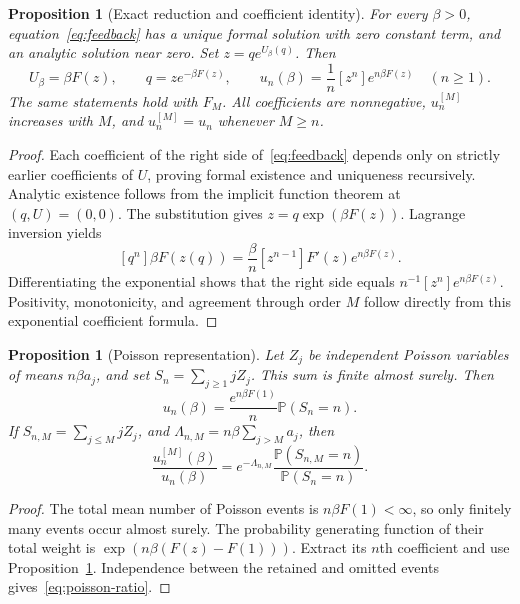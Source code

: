 \documentclass[11pt,a4paper]{article}
\numberwithin{equation}{section}
\newtheorem{proposition}[theorem]{Proposition}
\theoremstyle{definition}
\theoremstyle{remark}
\newcommand{\Prob}{\mathbb P}
\begin{document}
\begin{proposition}[Exact reduction and coefficient identity]
\label{prop:lagrange}
For every \(\beta>0\), equation~\eqref{eq:feedback} has a unique formal solution
with zero constant term, and an analytic solution near zero. Set
\(z=q e^{U_\beta(q)}\). Then
\begin{equation}
 U_\beta=\beta F(z),\qquad q=z e^{-\beta F(z)},\qquad
 u_n(\beta)=\frac1n[z^n]e^{n\beta F(z)}\quad(n\ge1).
 \label{eq:lagrange}
\end{equation}
The same statements hold with \(F_M\). All coefficients are nonnegative,
\(u_n^{[M]}\) increases with \(M\), and
\(u_n^{[M]}=u_n\) whenever \(M\ge n\).
\end{proposition}
\begin{proof}
Each coefficient of the right side of~\eqref{eq:feedback} depends only on
strictly earlier coefficients of \(U\), proving formal existence and
uniqueness recursively. Analytic existence follows from the implicit function
theorem at \((q,U)=(0,0)\). The substitution gives
\(z=q\exp(\beta F(z))\). Lagrange inversion yields
\[
 [q^n]\beta F(z(q))=\frac\beta n[z^{n-1}]F'(z)e^{n\beta F(z)}.
\]
Differentiating the exponential shows that the right side equals
\(n^{-1}[z^n]e^{n\beta F(z)}\). Positivity, monotonicity, and agreement through
order \(M\) follow directly from this exponential coefficient formula.
\end{proof}

\begin{proposition}[Poisson representation]
\label{prop:poisson}
Let \(Z_j\) be independent Poisson variables of means \(n\beta a_j\), and set
\(S_n=\sum_{j\ge1}jZ_j\). This sum is finite almost surely. Then
\begin{equation}
 u_n(\beta)=\frac{e^{n\beta F(1)}}n\Prob(S_n=n).
 \label{eq:poisson}
\end{equation}
If \(S_{n,M}=\sum_{j\le M}jZ_j\), and
\(\Lambda_{n,M}=n\beta\sum_{j>M}a_j\), then
\begin{equation}
 \frac{u_n^{[M]}(\beta)}{u_n(\beta)}
 =e^{-\Lambda_{n,M}}\frac{\Prob(S_{n,M}=n)}{\Prob(S_n=n)}.
 \label{eq:poisson-ratio}
\end{equation}
\end{proposition}
\begin{proof}
The total mean number of Poisson events is \(n\beta F(1)<\infty\), so only
finitely many events occur almost surely. The probability generating function
of their total weight is \(\exp(n\beta(F(z)-F(1)))\). Extract its \(n\)th
coefficient and use Proposition~\ref{prop:lagrange}. Independence between the
retained and omitted events gives~\eqref{eq:poisson-ratio}.
\end{proof}
\end{document}
